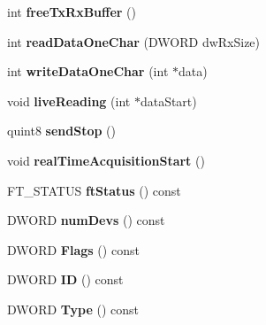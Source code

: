 \begin{DoxyCompactItemize}
\mbox{\label{class_f_t_d_i_function_ac296d77f1fc1d6ba330958bd79f76b36}} 
int {\bfseries free\+Tx\+Rx\+Buffer} ()
\item 
\mbox{\label{class_f_t_d_i_function_a642c3fcbc9e56bc6df6627f4431d7e07}} 
int {\bfseries read\+Data\+One\+Char} (D\+W\+O\+RD dw\+Rx\+Size)
\item 
\mbox{\label{class_f_t_d_i_function_a722511b8898f2d64197c276e67650359}} 
int {\bfseries write\+Data\+One\+Char} (int $\ast$data)
\item 
\mbox{\label{class_f_t_d_i_function_ad06869ea614ca9bc993a4d50a3349a7b}} 
void {\bfseries live\+Reading} (int $\ast$data\+Start)
\item 
\mbox{\label{class_f_t_d_i_function_a8e96fc7e1abef441b412a94e4fe998c9}} 
quint8 {\bfseries send\+Stop} ()
\item 
\mbox{\label{class_f_t_d_i_function_ad95ca315330a17f0ba39c56dc3c20596}} 
void {\bfseries real\+Time\+Acquisition\+Start} ()
\item 
\mbox{\label{class_f_t_d_i_function_a11fb109e1102262f5229241d56547785}} 
F\+T\+\_\+\+S\+T\+A\+T\+US {\bfseries ft\+Status} () const
\item 
\mbox{\label{class_f_t_d_i_function_a6f5950675a04b2f642405344989a4c40}} 
D\+W\+O\+RD {\bfseries num\+Devs} () const
\item 
\mbox{\label{class_f_t_d_i_function_a6afffffebfee24cc0db84a345558ae9a}} 
D\+W\+O\+RD {\bfseries Flags} () const
\item 
\mbox{\label{class_f_t_d_i_function_a2622f28f814d113cbe24b6a859a2e495}} 
D\+W\+O\+RD {\bfseries ID} () const
\item 
\mbox{\label{class_f_t_d_i_function_a02ed00fe1c72bd3021287b5ecaf7ed05}} 
D\+W\+O\+RD {\bfseries Type} () const
\item 

\end{DoxyCompactItemize}
